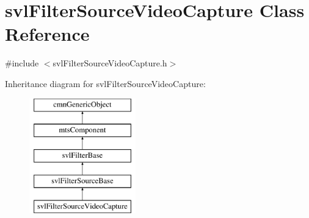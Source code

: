 \hypertarget{classsvl_filter_source_video_capture}{}\section{svl\+Filter\+Source\+Video\+Capture Class Reference}
\label{classsvl_filter_source_video_capture}


{\ttfamily \#include $<$svl\+Filter\+Source\+Video\+Capture.\+h$>$}

Inheritance diagram for svl\+Filter\+Source\+Video\+Capture\+:\begin{figure}[H]
\begin{center}
\leavevmode
\includegraphics[height=5.000000cm]{d2/d57/classsvl_filter_source_video_capture}
\end{center}
\end{figure}
